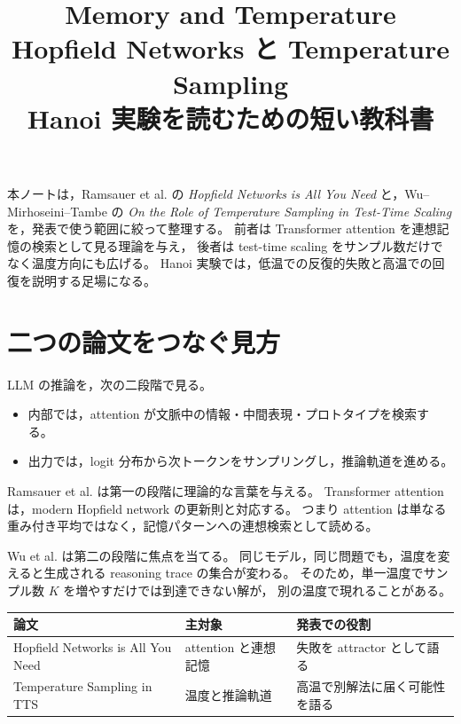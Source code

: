 \documentclass[a4paper,11pt]{ltjsarticle}
\title{\vspace{-1.1cm}
{\Large\color{accent}Memory and Temperature}\\[0.35em]
{\huge Hopfield Networks と Temperature Sampling}\\[0.35em]
{\large Hanoi 実験を読むための短い教科書}}
\author{}
\date{}
\theoremstyle{definition}
\theoremstyle{plain}
\theoremstyle{remark}
\begin{document}
\color{ink}
\maketitle
\vspace{-0.9cm}

\begin{center}
\begin{minipage}{0.88\linewidth}
\small
本ノートは，Ramsauer et al. の
\textit{Hopfield Networks is All You Need}
と，Wu--Mirhoseini--Tambe の
\textit{On the Role of Temperature Sampling in Test-Time Scaling}
を，発表で使う範囲に絞って整理する。
前者は Transformer attention を連想記憶の検索として見る理論を与え，
後者は test-time scaling をサンプル数だけでなく温度方向にも広げる。
Hanoi 実験では，低温での反復的失敗と高温での回復を説明する足場になる。
\end{minipage}
\end{center}

\section{二つの論文をつなぐ見方}

LLM の推論を，次の二段階で見る。

\begin{itemize}
\item 内部では，attention が文脈中の情報・中間表現・プロトタイプを検索する。
\item 出力では，logit 分布から次トークンをサンプリングし，推論軌道を進める。
\end{itemize}

Ramsauer et al. は第一の段階に理論的な言葉を与える。
Transformer attention は，modern Hopfield network の更新則と対応する。
つまり attention は単なる重み付き平均ではなく，記憶パターンへの連想検索として読める。

Wu et al. は第二の段階に焦点を当てる。
同じモデル，同じ問題でも，温度を変えると生成される reasoning trace の集合が変わる。
そのため，単一温度でサンプル数 \(K\) を増やすだけでは到達できない解が，
別の温度で現れることがある。

\begin{center}
\begin{tabular}{lll}
\toprule
論文 & 主対象 & 発表での役割 \\
\midrule
Hopfield Networks is All You Need & attention と連想記憶 & 失敗を attractor として語る \\
Temperature Sampling in TTS & 温度と推論軌道 & 高温で別解法に届く可能性を語る \\
\bottomrule
\end{tabular}
\end{center}
\end{document}
